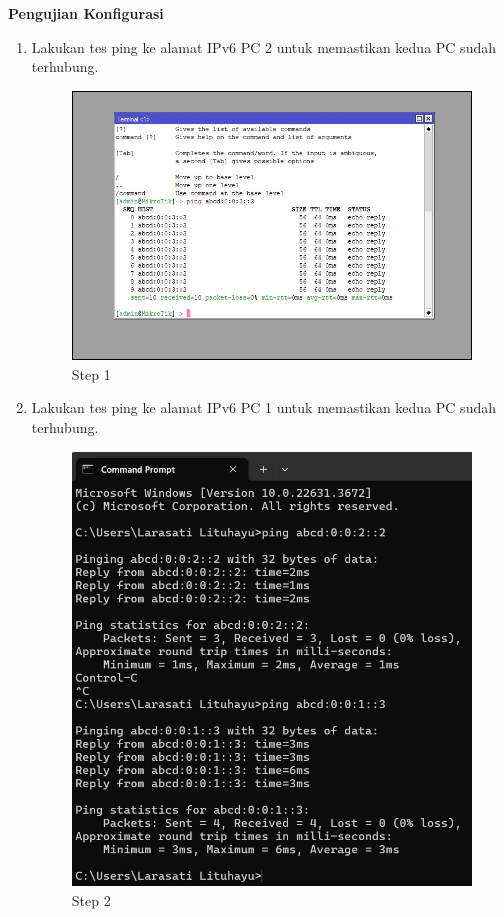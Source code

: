 \begin{enumerate}
\end{enumerate}

\begin{center} 
	\textbf{Pengujian Konfigurasi}
\end{center}

\begin{enumerate}
	\item Lakukan tes ping ke alamat IPv6 PC 2 untuk memastikan kedua PC sudah terhubung.
	
	\begin{figure}[H]
		\centering
		\includegraphics[width=0.7\linewidth]{P5/img/ping1ke2.jpg}
		\caption{Step 1}
		\label{fig:gambar1}
	\end{figure}

	\item Lakukan tes ping ke alamat IPv6 PC 1 untuk memastikan kedua PC sudah terhubung.
	
	\begin{figure}[H]
		\centering
		\includegraphics[width=0.7\linewidth]{P5/img/ping2ke1.jpg}
		\caption{Step 2}
		\label{fig:gambar1}
	\end{figure}

\end{enumerate}

